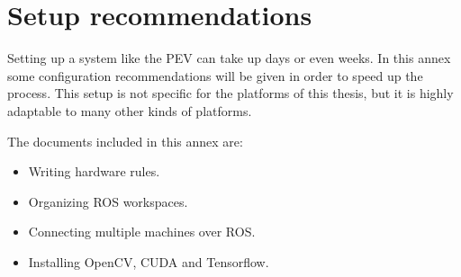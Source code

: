 
\chapter{Setup recommendations}

Setting up a system like the PEV can take up days or even weeks. In this annex some configuration recommendations will be given in order to speed up the process. This setup is not specific for the platforms of this thesis, but it is highly adaptable to many other kinds of platforms.

The documents included in this annex are:
\begin{itemize}
  \item Writing hardware rules.
  \item Organizing ROS workspaces.
  \item Connecting multiple machines over ROS.
  \item Installing OpenCV, CUDA and Tensorflow.
\end{itemize}